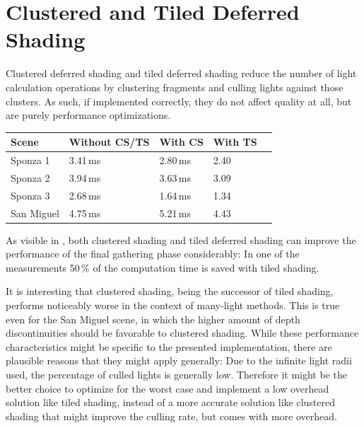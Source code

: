 \section{Clustered and Tiled Deferred Shading}
\label{sec:results:clusteredShading}

Clustered deferred shading and tiled deferred shading reduce the number of light calculation operations by clustering fragments and culling lights against those clusters. As such, if implemented correctly, they do not affect quality at all, but are purely performance optimizations.

\begin{table}[h]
    \centering
    \begin{tabulary}{0.98\textwidth}{| L | L | L | L | L |}
        \hline
        Scene & Without CS/TS & With CS & With TS \\ \hline
        Sponza 1 & 3.41\,ms & 2.80\,ms & 2.40\\
        Sponza 2 & 3.94\,ms & 3.63\,ms & 3.09\\
        Sponza 3 & 2.68\,ms & 1.64\,ms & 1.34\\
        San Miguel & 4.75\,ms & 5.21\,ms & 4.43\\
        \hline
    \end{tabulary}
    \label{tab:results:timings_clustered_shading}
\end{table}

As visible in , both clustered shading and tiled deferred shading can improve the performance of the final gathering phase considerably: In one of the measurements 50\,\% of the computation time is saved with tiled shading.


It is interesting that clustered shading, being the successor of tiled shading, performs noticeably worse in the context of many-light methods. This is true even for the San Miguel scene, in which the higher amount of depth discontinuities should be favorable to clustered shading. While these performance characteristics might be specific to the presented implementation, there are plausible reasons that they might apply generally: Due to the infinite light radii used, the percentage of culled lights is generally low. Therefore it might be the better choice to optimize for the worst case and implement a low overhead solution like tiled shading, instead of a more accurate solution like clustered shading that might improve the culling rate, but comes with more overhead.

